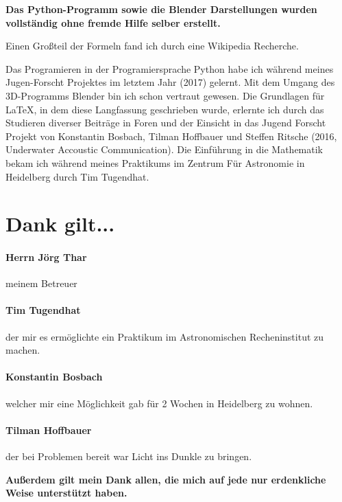 \begin{center}
 \textbf{
  Das Python-Programm sowie die Blender Darstellungen wurden vollständig ohne fremde Hilfe selber erstellt.
 }
\end{center}
\par Einen Großteil der Formeln fand ich durch eine Wikipedia Recherche.
\par Das Programieren in der Programiersprache Python habe ich während meines Jugen-Forscht Projektes im letztem Jahr (2017) gelernt. Mit dem Umgang des 3D-Programms Blender
bin ich schon vertraut gewesen. Die Grundlagen für \LaTeX, in dem diese Langfassung geschrieben wurde, erlernte ich durch das Studieren diverser Beiträge in Foren und der Einsicht
in das Jugend Forscht Projekt von Konstantin Bosbach, Tilman Hoffbauer und Steffen Ritsche (2016, Underwater Accoustic Communication).
Die Einführung in die Mathematik bekam ich während meines Praktikums im Zentrum Für Astronomie in Heidelberg durch Tim Tugendhat.
\raggedleft
\section*{Dank gilt...}
\paragraph{Herrn Jörg Thar} meinem Betreuer
\paragraph{Tim Tugendhat} der mir es ermöglichte ein Praktikum im Astronomischen Recheninstitut zu machen.
\paragraph{Konstantin Bosbach} welcher mir eine Möglichkeit gab für 2 Wochen in Heidelberg zu wohnen.
\paragraph{Tilman Hoffbauer} der bei Problemen bereit war Licht ins Dunkle zu bringen.


\centering
\vspace{0.5cm} \textbf{Außerdem gilt mein Dank allen, die mich auf jede nur erdenkliche Weise unterstützt haben.}

\raggedright
